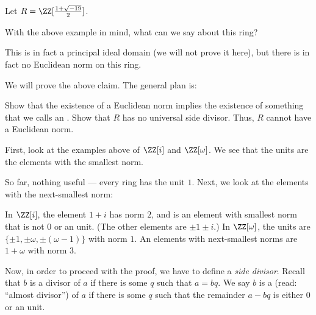 \begin{example}
	Let $R = \ZZ[\frac{1 + \sqrt{-19}}{2}]$.

	With the above example in mind, what can we say about this ring?

	This is in fact a principal ideal domain (we will not prove it here), but there is in fact no
	Euclidean norm on this ring.
\end{example}

We will prove the above claim. The general plan is:
\begin{itemize}
	\ii Show that the existence of a Euclidean norm implies the existence of something that we
	calls an .
	\ii Show that $R$ has no universal side divisor.
	\ii Thus, $R$ cannot have a Euclidean norm.
\end{itemize}

First, look at the examples above of $\ZZ[i]$ and $\ZZ[\omega]$. We see that the units are the
elements with the smallest norm.

So far, nothing useful --- every ring has the unit $1$. Next, we look at the elements with the
next-smallest norm:
\begin{itemize}
	\ii In $\ZZ[i]$, the element $1 + i$ has norm $2$, and is an element with smallest norm that is
	not $0$ or an unit. (The other elements are $\pm 1 \pm i$.)
	\ii In $\ZZ[\omega]$, the units are $\{ \pm 1, \pm \omega, \pm (\omega-1) \}$ with norm $1$. An
	elements with next-smallest norms are $1 + \omega$ with norm $3$.
\end{itemize}

Now, in order to proceed with the proof, we have to define a \emph{side divisor}.
Recall that $b$ is a divisor of $a$ if there is some $q$ such that $a = bq$.
We say $b$ is a  (read: ``almost divisor'') of $a$ if there is some $q$ such
that the remainder $a-bq$ is either $0$ or an unit.

